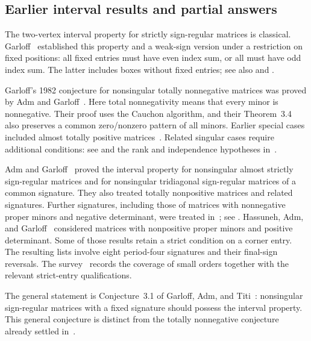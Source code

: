 \documentclass[10pt,a4paper]{article}
\theoremstyle{definition}
\theoremstyle{remark}
\numberwithin{equation}{section}
\begin{document}
\subsection{Earlier interval results and partial answers}\label{sec:earlier}

The two-vertex interval property for strictly sign-regular matrices is
classical. Garloff~\cite{Garloff1982} established this property and a
weak-sign version under a restriction on fixed positions: all fixed
entries must have even index sum, or all must have odd index sum.
The latter includes boxes without fixed entries; see also
\cite[Theorem~3.1]{Survey2016} and
\cite[Theorems~3.2--3.3]{AdmGarloff2026}.

Garloff's 1982 conjecture for nonsingular totally nonnegative matrices
was proved by Adm and Garloff~\cite[Theorem~3.6]{AdmGarloff2013}.
Here total nonnegativity means that every minor is nonnegative.
Their proof uses the Cauchon algorithm, and their Theorem~3.4 also
preserves a common zero/nonzero pattern of all minors. Earlier special
cases included almost totally positive
matrices~\cite{Garloff2003}. Related singular cases require additional
conditions: see \cite[Corollaries~3.7--3.8]{AdmGarloff2013} and the
rank and independence hypotheses in~\cite{Relax2020}.

Adm and Garloff~\cite{AdmGarloff2016} proved the interval property for
nonsingular almost strictly sign-regular matrices and for nonsingular
tridiagonal sign-regular matrices of a common signature. They also treated
totally nonpositive matrices and related signatures. Further signatures,
including those of matrices with nonnegative proper minors and negative
determinant, were treated in~\cite{AdmGarloff2021}; see
\cite[IP~2.8--2.9]{Survey2021}. Hassuneh, Adm, and
Garloff~\cite{HassunehAdmGarloff2025} considered matrices with
nonpositive proper minors and positive determinant. Some of those
results retain a strict condition on a corner entry. The resulting
lists involve eight period-four signatures and their final-sign
reversals. The survey~\cite{AdmGarloff2026} records the coverage of
small orders together with the relevant strict-entry qualifications.

The general statement is Conjecture~3.1 of Garloff, Adm, and
Titi~\cite[p.~7]{Survey2016}: nonsingular sign-regular matrices with a
fixed signature should possess the interval property. This general
conjecture is distinct from the totally nonnegative conjecture already
settled in~\cite{AdmGarloff2013}.
\end{document}
